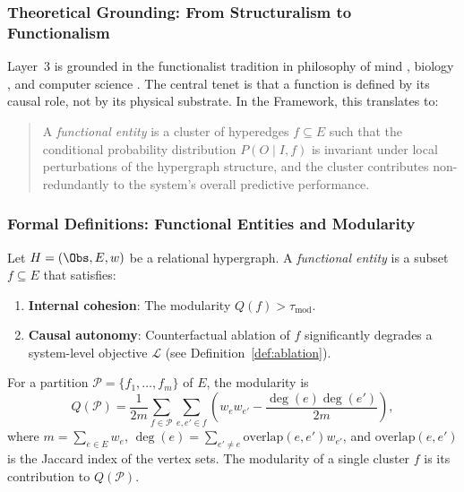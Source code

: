 \subsubsection{Theoretical Grounding: From Structuralism to Functionalism}
Layer~3 is grounded in the functionalist tradition in philosophy of mind \cite{putnam1967}, biology \cite{maturana1980}, and computer science \cite{turing1936}. The central tenet is that a function is defined by its causal role, not by its physical substrate. In the \Apeiron{} Framework, this translates to:
\begin{quote}
A \emph{functional entity} is a cluster of hyperedges $f \subseteq E$ such that the conditional probability distribution $P(O \mid I, f)$ is invariant under local perturbations of the hypergraph structure, and the cluster contributes non-redundantly to the system's overall predictive performance.
\end{quote}

\subsubsection{Formal Definitions: Functional Entities and Modularity}
\begin{definition}
Let $H = (\Obs, E, w)$ be a relational hypergraph. A \emph{functional entity} is a subset $f \subseteq E$ that satisfies:
\begin{enumerate}
    \item \textbf{Internal cohesion}: The modularity $Q(f) > \tau_{\text{mod}}$.
    \item \textbf{Causal autonomy}: Counterfactual ablation of $f$ significantly degrades a system-level objective $\mathcal{L}$ (see Definition~\ref{def:ablation}).
\end{enumerate}
\end{definition}

\begin{definition}
\label{def:modularity}
For a partition $\mathcal{P} = \{f_1, \dots, f_m\}$ of $E$, the modularity is
\[
Q(\mathcal{P}) = \frac{1}{2m} \sum_{f \in \mathcal{P}} \sum_{e,e' \in f} \left( w_e w_{e'} - \frac{\deg(e)\deg(e')}{2m} \right),
\]
where $m = \sum_{e \in E} w_e$, $\deg(e) = \sum_{e' \neq e} \text{overlap}(e,e') w_{e'}$, and $\text{overlap}(e,e')$ is the Jaccard index of the vertex sets. The modularity of a single cluster $f$ is its contribution to $Q(\mathcal{P})$.
\end{definition}

